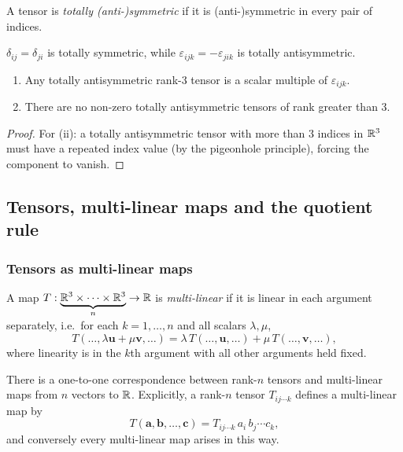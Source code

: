 \documentclass[a4paper]{article}
\begin{document}
\begin{defi}
  A tensor is \emph{totally (anti-)symmetric} if it is (anti-)symmetric in every pair of indices.
\end{defi}

\begin{eg}
  $\delta_{ij} = \delta_{ji}$ is totally symmetric, while $\varepsilon_{ijk} = -\varepsilon_{jik}$ is totally antisymmetric.
\end{eg}

\begin{prop}
  \leavevmode
  \begin{enumerate}
    \item Any totally antisymmetric rank-3 tensor is a scalar multiple of $\varepsilon_{ijk}$.
    \item There are no non-zero totally antisymmetric tensors of rank greater than 3.
  \end{enumerate}
\end{prop}
\begin{proof}
  For (ii): a totally antisymmetric tensor with more than 3 indices in $\mathbb{R}^3$ must have a repeated index value (by the pigeonhole principle), forcing the component to vanish.
\end{proof}

\subsection{Tensors, multi-linear maps and the quotient rule}
\subsubsection*{Tensors as multi-linear maps}

\begin{defi}
  A map $T: \underbrace{\mathbb{R}^3 \times \cdots \times \mathbb{R}^3}_{n} \to \mathbb{R}$ is \emph{multi-linear} if it is linear in each argument separately, i.e.\ for each $k = 1, \ldots, n$ and all scalars $\lambda, \mu$,
  \[
    T(\ldots, \lambda\mathbf{u} + \mu\mathbf{v}, \ldots) = \lambda\, T(\ldots, \mathbf{u}, \ldots) + \mu\, T(\ldots, \mathbf{v}, \ldots),
  \]
  where linearity is in the $k$th argument with all other arguments held fixed.
\end{defi}

\begin{thm}
  There is a one-to-one correspondence between rank-$n$ tensors and multi-linear maps from $n$ vectors to $\mathbb{R}$. Explicitly, a rank-$n$ tensor $T_{ij\cdots k}$ defines a multi-linear map by
  \[
    T(\mathbf{a}, \mathbf{b}, \ldots, \mathbf{c}) = T_{ij \cdots k}\, a_i\, b_j\cdots c_k,
  \]
  and conversely every multi-linear map arises in this way.
\end{thm}
\end{document}
